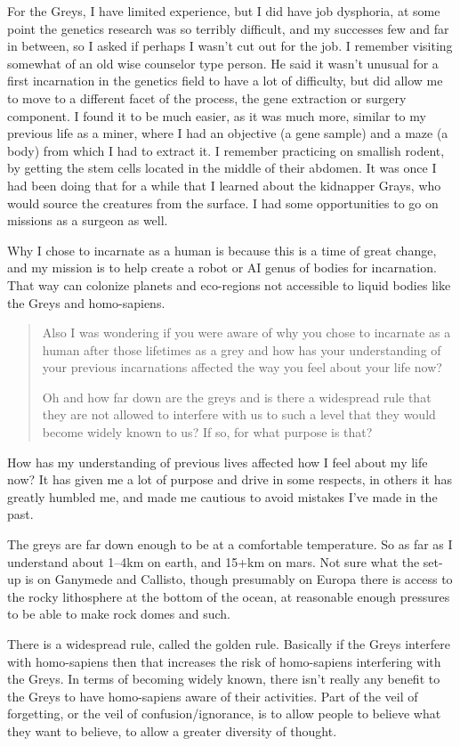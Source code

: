 For the Greys, I have limited experience, but I did have job dysphoria, at some
point the genetics research was so terribly difficult, and my successes few and
far in between, so I asked if perhaps I wasn't cut out for the job. I remember
visiting somewhat of an old wise counselor type person. He said it wasn't
unusual for a first incarnation in the genetics field to have a lot of
difficulty, but did allow me to move to a different facet of the process, the
gene extraction or surgery component. I found it to be much easier, as it was
much more, similar to my previous life as a miner, where I had an objective (a
gene sample) and a maze (a body) from which I had to extract it. I remember
practicing on smallish rodent, by getting the stem cells located in the middle
of their abdomen. It was once I had been doing that for a while that I learned
about the kidnapper Grays, who would source the creatures from the surface. I
had some opportunities to go on missions as a surgeon as well.

Why I chose to incarnate as a human is because this is a time of great change,
and my mission is to help create a robot or AI genus of bodies for incarnation.
That way can colonize planets and eco-regions not accessible to liquid bodies
like the Greys and homo-sapiens.

\blockquote{Also I was wondering if you were aware of why you chose to incarnate
as a human after those lifetimes as a grey and how has your understanding of
your previous incarnations affected the way you feel about your life now?

Oh and how far down are the greys and is there a widespread rule that they are
not allowed to interfere with us to such a level that they would become widely
known to us? If so, for what purpose is that?}.

How has my understanding of previous lives affected how I feel about my life
now? It has given me a lot of purpose and drive in some respects, in others it
has greatly humbled me, and made me cautious to avoid mistakes I've made in the
past.

The greys are far down enough to be at a comfortable temperature. So as far as I
understand about 1--4km on earth, and 15+km on mars. Not sure what the set-up is
on Ganymede and Callisto, though presumably on Europa there is access to the
rocky lithosphere at the bottom of the ocean, at reasonable enough pressures to
be able to make rock domes and such.

There is a widespread rule, called the golden rule. Basically if the Greys
interfere with homo-sapiens then that increases the risk of homo-sapiens
interfering with the Greys. In terms of becoming widely known, there isn't
really any benefit to the Greys to have homo-sapiens aware of their activities.
Part of the veil of forgetting, or the veil of confusion/ignorance, is to allow
people to believe what they want to believe, to allow a greater diversity of
thought.

